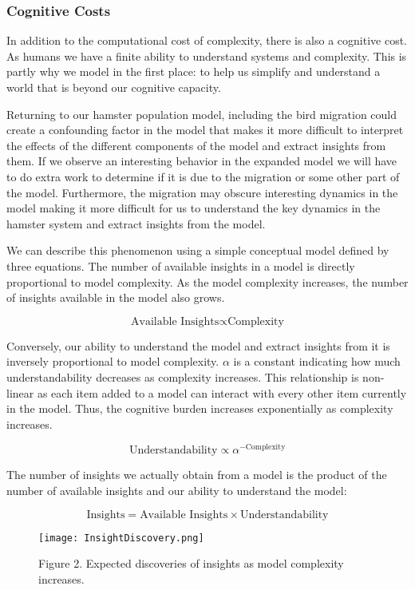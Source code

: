 \documentclass[]{memoir}
\makeatletter
\def\maxwidth{\ifdim\Gin@nat@width>\linewidth\linewidth
\else\Gin@nat@width\fi}
\let\Oldincludegraphics\includegraphics
\renewcommand{\includegraphics}[1]{\Oldincludegraphics[width=\maxwidth]{#1}}
\makeatother
\begin{document}
\subsubsection{Cognitive Costs}

In addition to the computational cost of complexity, there is also a
cognitive cost. As humans we have a finite ability to understand systems
and complexity. This is partly why we model in the first place: to help
us simplify and understand a world that is beyond our cognitive
capacity.

Returning to our hamster population model, including the bird migration
could create a confounding factor in the model that makes it more
difficult to interpret the effects of the different components of the
model and extract insights from them. If we observe an interesting
behavior in the expanded model we will have to do extra work to
determine if it is due to the migration or some other part of the model.
Furthermore, the migration may obscure interesting dynamics in the model
making it more difficult for us to understand the key dynamics in the
hamster system and extract insights from the model.

We can describe this phenomenon using a simple conceptual model defined
by three equations. The number of available insights in a model is
directly proportional to model complexity. As the model complexity
increases, the number of insights available in the model also grows.

\[ \text{Available Insights} \propto \text{Complexity} \]

Conversely, our ability to understand the model and extract insights
from it is inversely proportional to model complexity. $\alpha$ is a
constant indicating how much understandability decreases as complexity
increases. This relationship is non-linear as each item added to a model
can interact with every other item currently in the model. Thus, the
cognitive burden increases exponentially as complexity increases.

\[ \text{Understandability} \propto \alpha^{-\text{Complexity}} \]

The number of insights we actually obtain from a model is the product of
the number of available insights and our ability to understand the
model:

\[ \text{Insights} = \text{Available Insights} \times \text{Understandability} \]

\begin{figure}[htbp]
\centering
\texttt{[image: InsightDiscovery.png]}
\caption{Figure 2. Expected discoveries of insights as model complexity
increases.}
\end{figure}
\end{document}
